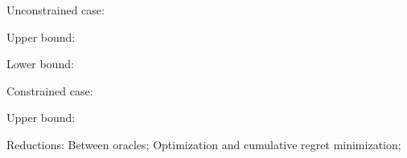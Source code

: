 
Unconstrained case:

Upper bound: 

Lower bound:

Constrained case:

Upper bound: 

Reductions:
Between oracles;
Optimization and cumulative regret minimization;


